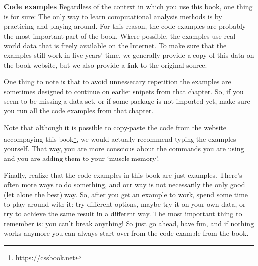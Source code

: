 \begin{feature}\textbf{Code examples}
Regardless of the context in which you use this book, one thing is for sure:
The only way to learn computational analysis methods is by practicing and playing around.
For this reason, the code examples are probably the most important part of the book.
Where possible, the examples use real world data that is freely available on the Internet.
To make sure that the examples still work in five years' time,
we generally provide a copy of this data on the book website,
but we also provide a link to the original source.

One thing to note is that to avoid unnessecary repetition
the examples are sometimes designed to continue on earlier
snipets from that chapter.
So, if you seem to be missing a data set, or if some package is not imported yet,
make sure you run all the code examples from that chapter.

Note that although it is possible to copy-paste the code from the website accompaying this book\footnote{https://cssbook.net},
we would actually recommend typing the examples yourself.
That way, you are more conscious about the commands you are using and you are adding them to your `muscle memory'.

Finally, realize that the code examples in this book are just examples.
There's often more ways to do something, and our way is not necessarily the only good (let alone the best) way.
So, after you get an example to work, spend some time to play around with it:
try different options, maybe try it on your own data, or try to achieve the same result in a different way.
The most important thing to remember is: you can't break anything!
So just go ahead, have fun, and if nothing works anymore you can always start over from the code example from the book. 
\end{feature}

